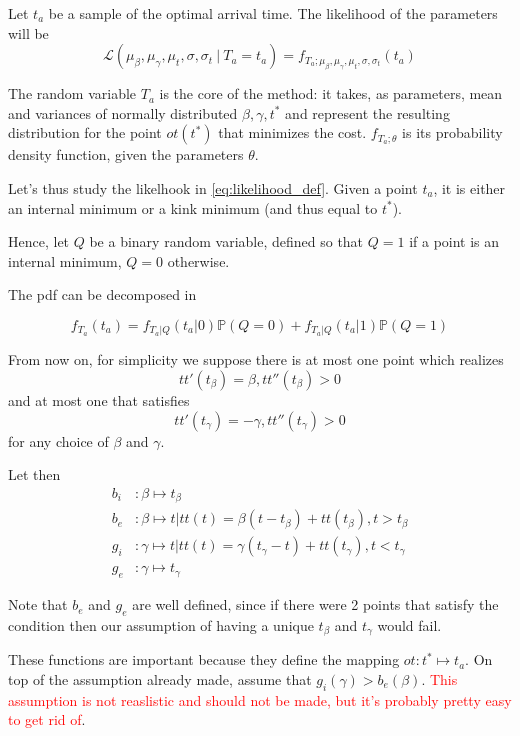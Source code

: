 \documentclass{article}
\begin{document}
Let \(t_a\) be a sample of the optimal arrival time. The likelihood of the parameters will be
\begin{equation}
  \label{eq:likelihood_def}
  \mathcal{L}(\mu_\beta, \mu_\gamma, \mu_t, \sigma, \sigma_t\ \vert\ T_a = t_a) =
  f_{T_a; \mu_\beta, \mu_\gamma, \mu_t, \sigma, \sigma_t}(t_a)
\end{equation}

The random variable \(T_a\) is the core of the method: it takes, as parameters, mean and variances of normally distributed \(\beta, \gamma, t^*\) and represent the resulting distribution for the point \(ot(t^*)\) that minimizes the cost.
\(f_{T_a; \theta}\) is its probability density function, given the parameters \(\theta\).

Let's thus study the likelhook in \eqref{eq:likelihood_def}.
Given a point \(t_a\), it is either an internal minimum or a kink minimum (and thus equal to \(t^*\)).

Hence, let \(Q\) be a binary random variable, defined so that \(Q=1\) if a point is an internal minimum, \(Q=0\) otherwise.

The pdf can be decomposed in

\begin{equation}
  \label{eq:likelihood_split}
  f_{T_a}(t_a) = f_{T_a | Q}(t_a | 0)\mathbb{P}(Q = 0) + f_{T_a | Q}(t_a | 1)\mathbb{P}(Q = 1)
\end{equation}

From now on, for simplicity we suppose there is at most one point which realizes
\[tt'(t_\beta) = \beta, tt''(t_\beta) > 0\]
and at most one that satisfies
\[tt'(t_\gamma) = -\gamma, tt''(t_\gamma) > 0\]
for any choice of \(\beta\) and \(\gamma\).

Let then
\begin{align*}
  b_i & : \beta \mapsto t_\beta \\
  b_e & : \beta \mapsto t | tt(t) = \beta (t - t_\beta) + tt(t_\beta), t > t_\beta\\
  g_i & : \gamma \mapsto t | tt(t) = \gamma (t_\gamma - t) + tt(t_\gamma), t < t_\gamma\\
  g_e & : \gamma \mapsto t_\gamma
\end{align*}

Note that \(b_e\) and \(g_e\) are well defined, since if there were 2 points that satisfy the condition then our assumption of having a unique \(t_\beta\) and \(t_\gamma\) would fail.

These functions are important because they define the mapping \(ot: t^* \mapsto t_a\).
On top of the assumption already made, assume that \(g_i(\gamma) > b_e(\beta)\). \textcolor{red}{This assumption is not reaslistic and should not be made, but it's probably pretty easy to get rid of}.
\end{document}
